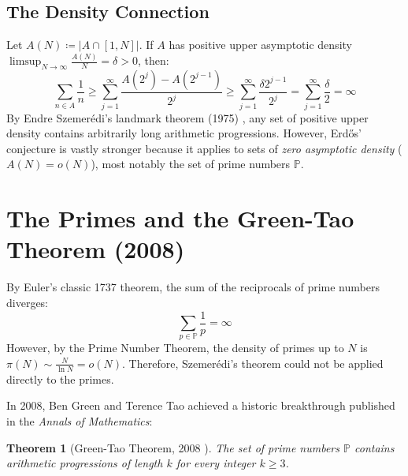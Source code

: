 \documentclass[11pt,a4paper]{article}
\newtheorem{theorem}{Theorem}[section]
\theoremstyle{definition}
\begin{document}
\subsection{The Density Connection}
Let $A(N) \coloneqq |A \cap [1, N]|$. If $A$ has positive upper asymptotic density $\limsup_{N \to \infty} \frac{A(N)}{N} = \delta > 0$, then:
\[ \sum_{n \in A} \frac{1}{n} \ge \sum_{j=1}^\infty \frac{A(2^j) - A(2^{j-1})}{2^j} \ge \sum_{j=1}^\infty \frac{\delta 2^{j-1}}{2^j} = \sum_{j=1}^\infty \frac{\delta}{2} = \infty \]
By Endre Szemer\'edi's landmark theorem (1975) \cite{szemeredi1975}, any set of positive upper density contains arbitrarily long arithmetic progressions.
However, Erd\H{o}s' conjecture is vastly stronger because it applies to sets of \emph{zero asymptotic density} ($A(N) = o(N)$), most notably the set of prime numbers $\mathbb{P}$.

\section{The Primes and the Green-Tao Theorem (2008)}

By Euler's classic 1737 theorem, the sum of the reciprocals of prime numbers diverges:
\begin{equation}\label{eq:euler_primes}
\sum_{p \in \mathbb{P}} \frac{1}{p} = \infty
\end{equation}
However, by the Prime Number Theorem, the density of primes up to $N$ is $\pi(N) \sim \frac{N}{\ln N} = o(N)$.
Therefore, Szemer\'edi's theorem could not be applied directly to the primes.

In 2008, Ben Green and Terence Tao \cite{green2008primes} achieved a historic breakthrough published in the \emph{Annals of Mathematics}:

\begin{theorem}[Green-Tao Theorem, 2008 \cite{green2008primes}]\label{thm:green_tao}
The set of prime numbers $\mathbb{P}$ contains arithmetic progressions of length $k$ for every integer $k \ge 3$.
\end{theorem}
\end{document}
